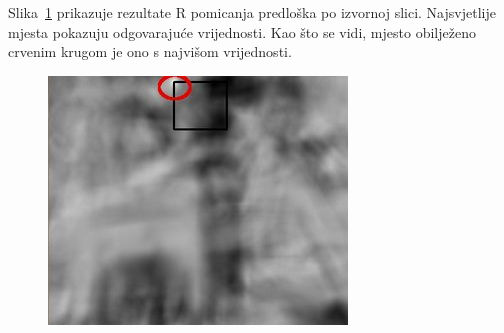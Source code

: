 Slika~\ref{fig:tm3.jpg} prikazuje rezultate R pomicanja predloška po
izvornoj slici. Najsvjetlije mjesta pokazuju odgovarajuće
vrijednosti. Kao što se vidi, mjesto obilježeno crvenim krugom 
je ono s najvišom vrijednosti.  


\begin{figure}[h]
\centering
\includegraphics[scale=0.8]{figures/tm3.jpg}
\caption{}
\label{fig:tm3.jpg}
\end{figure}

